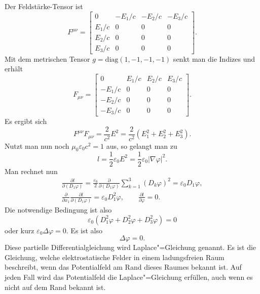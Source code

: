 \documentclass[a4paper,10pt,fleqn,twocolumn,twoside]{article}
\numberwithin{equation}{section}
\begin{document}
Der Feldstärke-Tensor ist
\begin{equation}
F^{\mu\nu} = \begin{bmatrix}
0 & -E_1/c & -E_2/c & -E_3/c\\
E_1/c & 0 & 0 & 0\\
E_2/c & 0 & 0 & 0\\
E_3/c & 0 & 0 & 0
\end{bmatrix}.
\end{equation}
Mit dem metrischen Tensor $g=\mathrm{diag}(1,-1,-1,-1)$ senkt man
die Indizes und erhält
\begin{equation}
F_{\mu\nu} = \begin{bmatrix}
0 & E_1/c & E_2/c & E_3/c\\
-E_1/c & 0 & 0 & 0\\
-E_2/c & 0 & 0 & 0\\
-E_3/c & 0 & 0 & 0
\end{bmatrix}.
\end{equation}
Es ergibt sich
\begin{equation}
F^{\mu\nu}F_{\mu\nu} = \frac{2}{c^2} E^2
= \frac{2}{c^2} (E_1^2+E_2^2+E_3^2).
\end{equation}
Nutzt man nun noch $\mu_0\varepsilon_0 c^2=1$ aus, so gelangt man zu
\begin{equation}
l = \frac{1}{2}\varepsilon_0 E^2
= \frac{1}{2}\varepsilon_0 |\nabla\varphi|^2.
\end{equation}
Man rechnet nun
\begin{gather*}
\frac{\partial l}{\partial(D_1\varphi)}
= \frac{\varepsilon_0}{2} \frac{\partial}{\partial(D_1\varphi)}
\sum_{k=1}^3 (D_k\varphi)^2 = \varepsilon_0 D_1\varphi,\\
\frac{\partial}{\partial x_1}\frac{\partial l}{\partial(D_1\varphi)}
= \varepsilon_0 D_1^2\varphi,\qquad
\frac{\partial l}{\partial\varphi} = 0.
\end{gather*}
Die notwendige Bedingung ist also
\begin{equation}
\varepsilon_0 (D_1^2\varphi+D_2^2\varphi+D_3^2\varphi) = 0
\end{equation}
oder kurz $\varepsilon_0 \Delta\varphi=0$. Es ist also
\begin{equation}
\Delta\varphi=0.
\end{equation}
Diese partielle Differentialgleichung wird Laplace"=Gleichung genannt.
Es ist die Gleichung, welche elektrostatische Felder in einem
ladungsfreien Raum beschreibt, wenn das Potentialfeld am Rand dieses
Raumes bekannt ist. Auf jeden Fall wird das Potentialfeld die
Laplace"=Gleichung erfüllen, auch wenn es nicht auf dem Rand
bekannt ist.
\end{document}

